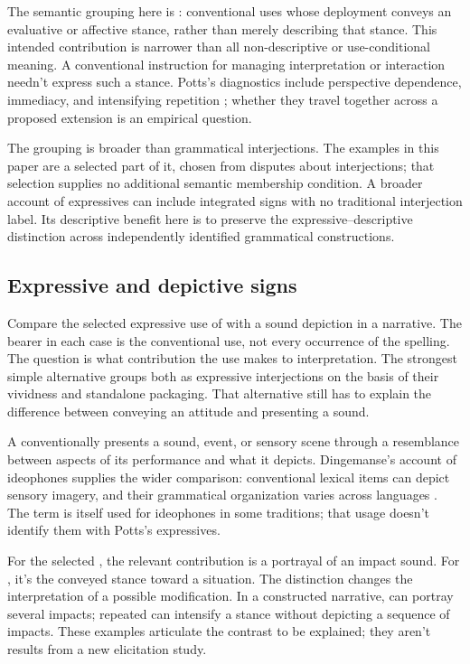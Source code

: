 \documentclass[12pt]{article}
\begin{document}
The semantic grouping here is : conventional uses
whose deployment conveys an evaluative or affective stance, rather than
merely describing that stance. This intended contribution is narrower than
all non-descriptive or use-conditional meaning. A conventional instruction
for managing interpretation or interaction needn't express such a stance.
Potts's diagnostics include perspective dependence, immediacy, and
intensifying repetition \citep[166--167]{potts2007}; whether they travel
together across a proposed extension is an empirical question.

The grouping is broader than grammatical interjections. The examples in
this paper are a selected part of it, chosen from disputes about
interjections; that selection supplies no additional semantic membership
condition. A broader account of expressives can include integrated signs
with no traditional interjection label. Its descriptive benefit here is
to preserve the expressive--descriptive distinction across independently
identified grammatical constructions.

\subsection{Expressive and depictive signs}\label{sec:expressive-depictive}

Compare the selected expressive use of  with a sound depiction
 in a narrative. The bearer in each case is the conventional
use, not every occurrence of the spelling. The question is what contribution
the use makes to interpretation. The strongest simple alternative groups
both as expressive interjections on the basis of their vividness and
standalone packaging. That alternative still has to explain the difference
between conveying an attitude and presenting a sound.

A  conventionally presents a sound, event, or sensory
scene through a resemblance between aspects of its performance and what
it depicts. Dingemanse's account of ideophones supplies the wider comparison:
conventional lexical items can depict sensory imagery, and their grammatical
organization varies across languages \citep[2--3]{dingemanse2018}.
The term  is itself used for ideophones in some traditions;
that usage doesn't identify them with Potts's expressives.

For the selected , the relevant contribution is a portrayal
of an impact sound. For , it's the conveyed stance toward
a situation. The distinction changes the interpretation of a possible
modification. In a constructed narrative,  can
portray several impacts; repeated  can intensify a stance
without depicting a sequence of impacts. These examples articulate the
contrast to be explained; they aren't results from a new elicitation study.
\end{document}
